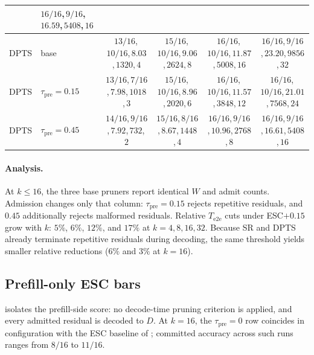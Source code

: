 \begin{table}[t]
\begin{tabular}{@{}llcccc@{}}
 & $16/16$,\,$9/16$,\,$16.59$,\,$5408$,\,$16$ \\
\midrule
DPTS
 & base
 & $13/16$,\,$10/16$,\,$8.03$,\,$1320$,\,$4$
 & $15/16$,\,$10/16$,\,$9.06$,\,$2624$,\,$8$
 & $16/16$,\,$10/16$,\,$11.87$,\,$5008$,\,$16$
 & $16/16$,\,$9/16$,\,$23.20$,\,$9856$,\,$32$ \\
\rowcolor{tblalt}
DPTS
 & $\tau_{\mathrm{pre}}{=}0.15$
 & $13/16$,\,$7/16$,\,$7.98$,\,$1018$,\,$3$
 & $15/16$,\,$10/16$,\,$8.96$,\,$2020$,\,$6$
 & $16/16$,\,$10/16$,\,$11.57$,\,$3848$,\,$12$
 & $16/16$,\,$10/16$,\,$21.01$,\,$7568$,\,$24$ \\
DPTS
 & $\tau_{\mathrm{pre}}{=}0.45$
 & $14/16$,\,$9/16$,\,$7.92$,\,$732$,\,$2$
 & $15/16$,\,$8/16$,\,$8.67$,\,$1448$,\,$4$
 & $16/16$,\,$9/16$,\,$10.96$,\,$2768$,\,$8$
 & $16/16$,\,$9/16$,\,$16.61$,\,$5408$,\,$16$ \\
\bottomrule
\end{tabular}
\end{table}

\paragraph{Analysis.}
At $k\le16$, the three base pruners report identical $W$ and admit counts.
Admission changes only that column: $\tau_{\mathrm{pre}}{=}0.15$ rejects repetitive residuals, and $0.45$ additionally rejects malformed residuals.
Relative $T_{\mathrm{e2e}}$ cuts under ESC${+}0.15$ grow with $k$:
$5\%$, $6\%$, $12\%$, and $17\%$ at $k{=}4,8,16,32$.
Because SR and DPTS already terminate repetitive residuals during decoding, the same threshold yields smaller relative reductions
($6\%$ and $3\%$ at $k{=}16$).

\subsection{Prefill-only ESC bars}
\label{sec:ablate-prefill}

 isolates the prefill-side score: no decode-time pruning criterion is applied, and every admitted residual is decoded to $D$.
At $k{=}16$, the $\tau_{\mathrm{pre}}{=}0$ row coincides in configuration with the ESC baseline of ; committed accuracy across such runs ranges from $8/16$ to $11/16$.

